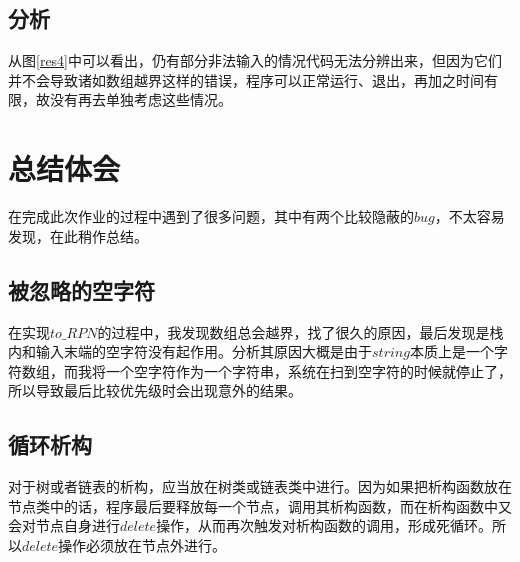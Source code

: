 \documentclass[UTF8]{ctexart}
\begin{document}
	\subsection{分析}\label{time_of_PrintLots}
	\indent 从图\ref{res4}中可以看出，仍有部分非法输入的情况代码无法分辨出来，但因为它们并不会导致诸如数组越界这样的错误，程序可以正常运行、退出，再加之时间有限，故没有再去单独考虑这些情况。
	

	\section{总结体会}
	\indent 在完成此次作业的过程中遇到了很多问题，其中有两个比较隐蔽的$bug$，不太容易发现，在此稍作总结。
	\subsection{被忽略的空字符}
	\indent 在实现$to\_RPN$的过程中，我发现数组总会越界，找了很久的原因，最后发现是栈内和输入末端的空字符没有起作用。分析其原因大概是由于$string$本质上是一个字符数组，而我将一个空字符作为一个字符串，系统在扫到空字符的时候就停止了，所以导致最后比较优先级时会出现意外的结果。
	
	\subsection{循环析构}
	\indent 对于树或者链表的析构，应当放在树类或链表类中进行。因为如果把析构函数放在节点类中的话，程序最后要释放每一个节点，调用其析构函数，而在析构函数中又会对节点自身进行$delete$操作，从而再次触发对析构函数的调用，形成死循环。所以$delete$操作必须放在节点外进行。


\end{document}
